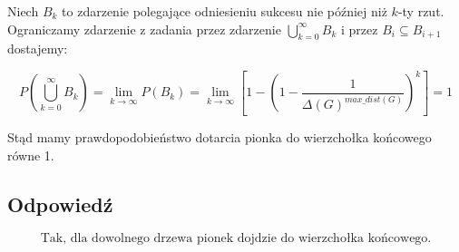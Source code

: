 Niech \(B_k\) to zdarzenie polegające odniesieniu sukcesu nie później niż \(k\)-ty rzut. Ograniczamy zdarzenie z zadania przez zdarzenie \(\bigcup_{k=0}^\infty B_k\) i przez \(B_i \subseteq B_{i+1}\) dostajemy:

\[
	P(\bigcup_{k=0}^\infty B_k) = \lim_{k \to \infty}P(B_k) = \lim_{k \to \infty}\left[1 - \left(1 - \frac 1 {\Delta(G)^{max\_dist(G)}}\right)^k\right] = 1
\]

Stąd mamy prawdopodobieństwo dotarcia pionka do wierzchołka końcowego równe 1.

\subsection*{Odpowiedź}
\[
	\boxed{\text{Tak, dla dowolnego drzewa pionek dojdzie do wierzchołka końcowego.}}
\]
